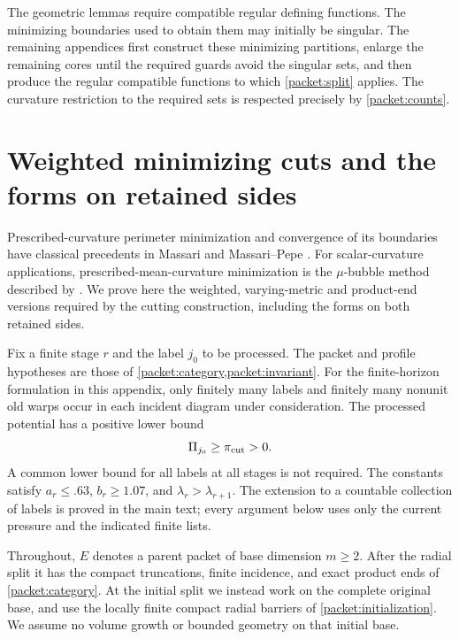 \documentclass[11pt]{article}
\numberwithin{equation}{section}
\theoremstyle{definition}
\theoremstyle{remark}
\begin{document}
The geometric lemmas require compatible regular defining functions.
The minimizing boundaries used to obtain them may initially be
singular.  The remaining appendices first construct these minimizing
partitions, enlarge the remaining cores until the required guards
avoid the singular sets, and then produce the regular compatible functions to which
\cref{packet:split} applies.  The curvature restriction to the required
sets is respected precisely by \cref{packet:counts}.

\section{Weighted minimizing cuts and the forms on retained sides}\label{sec:cut}

Prescribed-curvature perimeter minimization and convergence of its
boundaries have classical precedents in Massari and Massari--Pepe
\citep{massari1975,massariPepe1975}. For scalar-curvature applications,
prescribed-mean-curvature minimization is the $\mu$-bubble method
described by \citet[\S\(5\frac56\)]{gromov1996}.
We prove here the weighted,
varying-metric and product-end versions required by the cutting
construction, including the forms on both retained sides.

Fix a finite stage $r$ and the label $j_0$ to be processed.  The
packet and profile hypotheses are those of \cref{packet:category,packet:invariant}.
For the finite-horizon formulation in this appendix, only finitely many
labels and finitely many nonunit old warps occur in each incident diagram
under consideration.  The processed potential has a positive lower bound
\[
                         \Pi_{j_0}\ge\pi_{\rm cut}>0.
\]
A common lower bound for all labels at all stages is not required.
The constants satisfy $a_r\le .63$, $b_r\ge1.07$, and
$\lambda_r>\lambda_{r+1}$.  The extension to a countable collection of
labels is proved in the main text; every argument below uses only the
current pressure and the indicated finite lists.

Throughout, $E$ denotes a parent packet of base dimension $m\ge2$.
After the radial split it has the compact truncations, finite incidence,
and exact product ends of \cref{packet:category}.  At the initial split
we instead work on the complete original base, and use the locally finite
compact radial barriers of \cref{packet:initialization}.  We assume no
volume growth or bounded geometry on that initial base.
\end{document}
